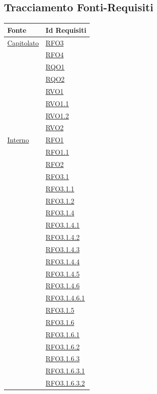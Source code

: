 \subsection{Tracciamento Fonti-Requisiti}
\normalsize
\begin{longtable}{|>{\centering}m{5cm}|m{5cm}<{\centering}|}
\hline
\textbf{Fonte} & \textbf{Id Requisiti}\\
\hline
\endhead
\hyperlink{Capitolato}{Capitolato} & \hyperlink{RFO3}{RFO3}\\
& \hyperlink{RFO4}{RFO4}\\
& \hyperlink{RQO1}{RQO1}\\
& \hyperlink{RQO2}{RQO2}\\
& \hyperlink{RVO1}{RVO1}\\
& \hyperlink{RVO1.1}{RVO1.1}\\
& \hyperlink{RVO1.2}{RVO1.2}\\
& \hyperlink{RVO2}{RVO2}\\ \hline
\hyperlink{Interno}{Interno} & \hyperlink{RFO1}{RFO1}\\
& \hyperlink{RFO1.1}{RFO1.1}\\
& \hyperlink{RFO2}{RFO2}\\
& \hyperlink{RFO3.1}{RFO3.1}\\
& \hyperlink{RFO3.1.1}{RFO3.1.1}\\
& \hyperlink{RFO3.1.2}{RFO3.1.2}\\
& \hyperlink{RFO3.1.4}{RFO3.1.4}\\
& \hyperlink{RFO3.1.4.1}{RFO3.1.4.1}\\
& \hyperlink{RFO3.1.4.2}{RFO3.1.4.2}\\
& \hyperlink{RFO3.1.4.3}{RFO3.1.4.3}\\
& \hyperlink{RFO3.1.4.4}{RFO3.1.4.4}\\
& \hyperlink{RFO3.1.4.5}{RFO3.1.4.5}\\
& \hyperlink{RFO3.1.4.6}{RFO3.1.4.6}\\
& \hyperlink{RFO3.1.4.6.1}{RFO3.1.4.6.1}\\
& \hyperlink{RFO3.1.5}{RFO3.1.5}\\
& \hyperlink{RFO3.1.6}{RFO3.1.6}\\
& \hyperlink{RFO3.1.6.1}{RFO3.1.6.1}\\
& \hyperlink{RFO3.1.6.2}{RFO3.1.6.2}\\
& \hyperlink{RFO3.1.6.3}{RFO3.1.6.3}\\
& \hyperlink{RFO3.1.6.3.1}{RFO3.1.6.3.1}\\
& \hyperlink{RFO3.1.6.3.2}{RFO3.1.6.3.2}\\

\end{longtable}
